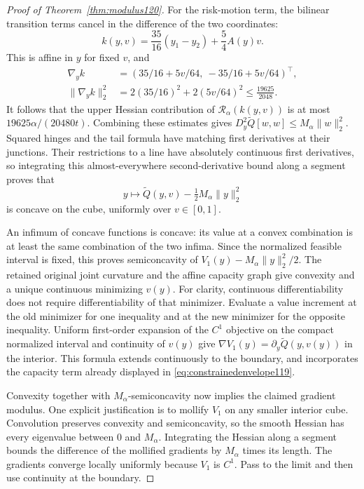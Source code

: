 \begin{proof}[Proof of Theorem~\ref{thm:modulus120}]
For the risk-motion term, the bilinear transition terms cancel
in the difference of the two coordinates:
\[
 k(y,v)=\frac{35}{16}(y_1-y_2)+\frac54A(y)v.
\]
This is affine in $y$ for fixed $v$, and
\begin{align*}
 \nabla_y k&=(35/16+5v/64,\ -35/16+5v/64)^\top,\\
 \|\nabla_y k\|_2^2
 &=2(35/16)^2+2(5v/64)^2
 \le\frac{19625}{2048}.
\end{align*}
It follows that the upper Hessian contribution of
$\mathcal R_\alpha(k(y,v))$ is at most
$19625\alpha/(20480t)$.  Combining these estimates gives
$D_y^2\widetilde Q[w,w]\le M_\alpha\|w\|_2^2$.
Squared hinges and the tail formula have matching first derivatives
at their junctions.  Their restrictions to a line have absolutely
continuous first derivatives, so integrating this almost-everywhere
second-derivative bound along a segment proves that
\[
 y\longmapsto\widetilde Q(y,v)-\tfrac12M_\alpha\|y\|_2^2
\]
is concave on the cube, uniformly over $v\in[0,1]$.

An infimum of concave functions is concave: its value at a convex
combination is at least the same combination of the two infima.
Since the normalized feasible interval is fixed, this proves
semiconcavity of
$V_1(y)-M_\alpha\|y\|_2^2/2$.
The retained original joint curvature and the affine capacity graph
give convexity and a unique continuous minimizing $v(y)$.
For clarity, continuous differentiability does not require
differentiability of that minimizer.  Evaluate a value increment at
the old minimizer for one inequality and at the new minimizer for
the opposite inequality.  Uniform first-order expansion of the
$C^1$ objective on the compact normalized interval and continuity of
$v(y)$ give
$\nabla V_1(y)=\partial_y\widetilde Q(y,v(y))$ in the interior.
This formula extends continuously to the boundary, and incorporates
the capacity term already displayed in
\eqref{eq:constrainedenvelope119}.

Convexity together with $M_\alpha$-semiconcavity now implies the
claimed gradient modulus.  One explicit justification is to mollify
$V_1$ on any smaller interior cube.  Convolution preserves convexity
and semiconcavity, so the smooth Hessian has every eigenvalue between
$0$ and $M_\alpha$.  Integrating the Hessian along a segment bounds
the difference of the mollified gradients by $M_\alpha$ times its
length.  The gradients converge locally uniformly because $V_1$ is
$C^1$.  Pass to the limit and then use continuity at the boundary.


\end{proof}
